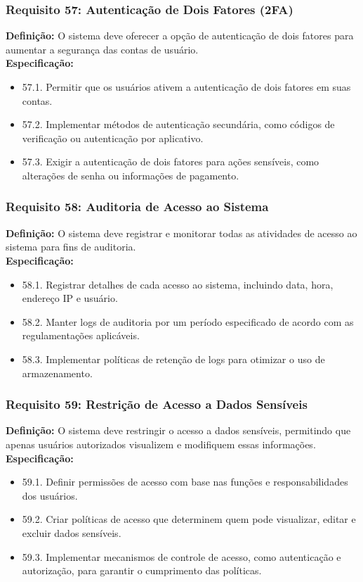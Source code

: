 \subsubsection{Requisito 57: Autenticação de Dois Fatores (2FA)}
\textbf{Definição:} O sistema deve oferecer a opção de autenticação de dois fatores para aumentar a segurança das contas de usuário.
\\
\textbf{Especificação:}
\begin{itemize}
	\item 57.1. Permitir que os usuários ativem a autenticação de dois fatores em suas contas.
	\item 57.2. Implementar métodos de autenticação secundária, como códigos de verificação ou autenticação por aplicativo.
	\item 57.3. Exigir a autenticação de dois fatores para ações sensíveis, como alterações de senha ou informações de pagamento.
\end{itemize}

\subsubsection{Requisito 58: Auditoria de Acesso ao Sistema}
\textbf{Definição:} O sistema deve registrar e monitorar todas as atividades de acesso ao sistema para fins de auditoria.
\\
\textbf{Especificação:}
\begin{itemize}
	\item 58.1. Registrar detalhes de cada acesso ao sistema, incluindo data, hora, endereço IP e usuário.
	\item 58.2. Manter logs de auditoria por um período especificado de acordo com as regulamentações aplicáveis.
	\item 58.3. Implementar políticas de retenção de logs para otimizar o uso de armazenamento.
\end{itemize}

\subsubsection{Requisito 59: Restrição de Acesso a Dados Sensíveis}
\textbf{Definição:} O sistema deve restringir o acesso a dados sensíveis, permitindo que apenas usuários autorizados visualizem e modifiquem essas informações.
\\
\textbf{Especificação:}
\begin{itemize}
	\item 59.1. Definir permissões de acesso com base nas funções e responsabilidades dos usuários.
	\item 59.2. Criar políticas de acesso que determinem quem pode visualizar, editar e excluir dados sensíveis.
	\item 59.3. Implementar mecanismos de controle de acesso, como autenticação e autorização, para garantir o cumprimento das políticas.
\end{itemize}

